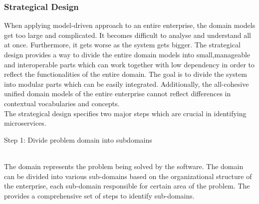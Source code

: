 \subsubsection{Strategical Design}\label{section:domain_driven_design/process_to_domain_driven_design/strategical_design}
When applying model-driven approach to an entire enterprise, the domain models get too large and complicated. It becomes difficult to analyse and understand all at once. Furthermore, it gets worse as the system gets bigger. The strategical design provides a way to divide the entire domain models into small,manageable and interoperable parts which can work together with low dependency in order to reflect the functionalities of the entire domain. The goal is to divide the system into modular parts which can be easily integrated. Additionally, the all-cohesive unified domain models of the entire enterprise cannot reflect differences in contextual vocabularies and concepts.\cite{Fowler:2014ab}\cite{Evans:2003aa}\cite{Vernon:2013aa}
\\
The strategical design specifies two major steps which are crucial in identifying microservices.
\\
\begin{shaded}Step 1: Divide problem domain into subdomains \end{shaded} \label{section:domain_driven_design/process_to_domain_driven_design/strategical_design/step_1}
\\
The domain represents the problem being solved by the software. The domain can be divided into various sub-domains based on the organizational structure of the enterprise, each sub-domain responsible for certain area of the problem. The \cite{Engels:2015aa} provides a comprehensive set of steps to identify sub-domains.
